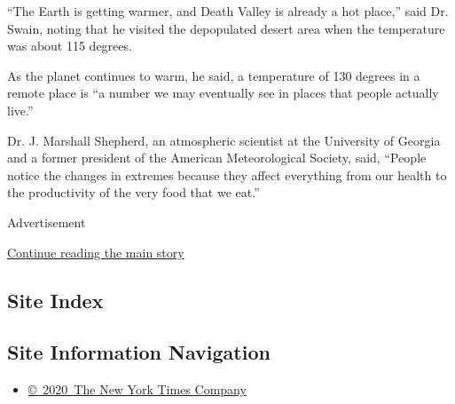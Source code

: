 ``The Earth is getting warmer, and Death Valley is already a hot
place,'' said Dr. Swain, noting that he visited the depopulated desert
area when the temperature was about 115 degrees.

As the planet continues to warm, he said, a temperature of 130 degrees
in a remote place is ``a number we may eventually see in places that
people actually live.''

Dr. J. Marshall Shepherd, an atmospheric scientist at the University of
Georgia and a former president of the American Meteorological Society,
said, ``People notice the changes in extremes because they affect
everything from our health to the productivity of the very food that we
eat.''

Advertisement

\protect\hyperlink{after-bottom}{Continue reading the main story}

\hypertarget{site-index}{%
\subsection{Site Index}\label{site-index}}

\hypertarget{site-information-navigation}{%
\subsection{Site Information
Navigation}\label{site-information-navigation}}

\begin{itemize}
\tightlist
\item
  \href{https://help.nytimes3xbfgragh.onion/hc/en-us/articles/115014792127-Copyright-notice}{©~2020~The
  New York Times Company}
\end{itemize}

